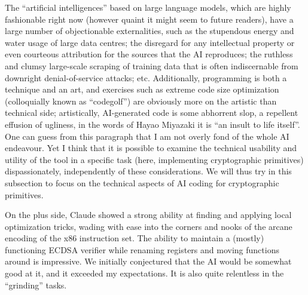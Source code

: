 \documentclass{llncs}
\begin{document}
The ``artificial intelligences'' based on large language models, which
are highly fashionable right now (however quaint it might seem to future
readers), have a large number of objectionable externalities, such as
the stupendous energy and water usage of large data centres; the
disregard for any intellectual property or even courteous attribution
for the sources that the AI reproduces; the ruthless and clumsy
large-scale scraping of training data that is often indiscernable from
downright denial-of-service attacks; etc. Additionally, programming is
both a technique and an art, and exercises such as extreme code size
optimization (colloquially known as ``codegolf'') are obviously more on
the artistic than technical side; artistically, AI-generated code is
some abhorrent slop, a repellent effusion of ugliness, in the words of
Hayao Miyazaki it is ``an insult to life itself''. One can guess from
this paragraph that I am not overly fond of the whole AI endeavour. Yet
I think that it is possible to examine the technical usability and
utility of the tool in a specific task (here, implementing cryptographic
primitives) dispassionately, independently of these considerations. We
will thus try in this subsection to focus on the technical aspects of AI
coding for cryptographic primitives.

On the plus side, Claude showed a strong ability at finding and applying
local optimization tricks, wading with ease into the corners and nooks
of the arcane encoding of the x86 instruction set. The ability to
maintain a (mostly) functioning ECDSA verifier while renaming registers
and moving functions around is impressive. We initially conjectured that
the AI would be somewhat good at it, and it exceeded my expectations. It
is also quite relentless in the ``grinding'' tasks.
\end{document}
